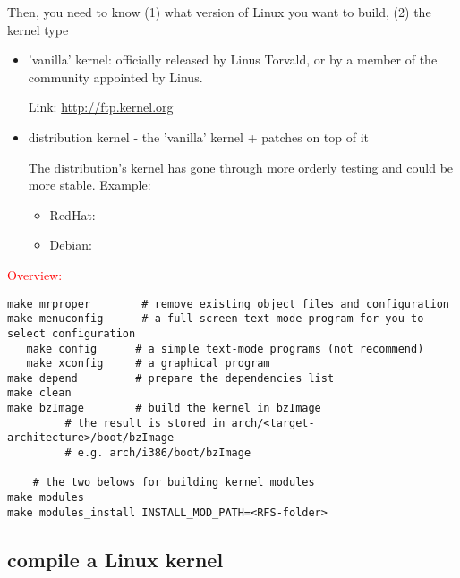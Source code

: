Then, you need to know (1) what version of Linux you want to build, (2)
the kernel type
\begin{itemize}
  \item 'vanilla' kernel: officially released by Linus Torvald, or by a member
  of the community appointed by Linus.
  
Link: \url{http://ftp.kernel.org}
   
  \item distribution kernel - the 'vanilla' kernel + patches on top of it
  
  The distribution's kernel has gone through more orderly testing and could be
  more stable. Example:
  \begin{itemize}
    \item RedHat:
    \item Debian:
  \end{itemize}
\end{itemize}

\textcolor{red}{Overview:}
\begin{verbatim}
make mrproper        # remove existing object files and configuration
make menuconfig      # a full-screen text-mode program for you to select configuration
   make config      # a simple text-mode programs (not recommend)
   make xconfig     # a graphical program
make depend         # prepare the dependencies list
make clean
make bzImage        # build the kernel in bzImage
         # the result is stored in arch/<target-architecture>/boot/bzImage 
         # e.g. arch/i386/boot/bzImage 
         
    # the two belows for building kernel modules
make modules        
make modules_install INSTALL_MOD_PATH=<RFS-folder> 
\end{verbatim}

\subsection{compile a Linux kernel}


